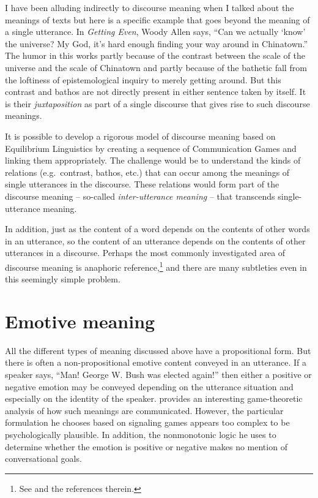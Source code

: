 I have been alluding indirectly to discourse meaning when I talked about the meanings of texts but here is a specific example that goes beyond the meaning of a single utterance. In \emph{Getting Even}, Woody Allen says, ``Can we actually `know' the universe? My God, it's hard enough finding your way around in Chinatown.'' The humor in this works partly because of the contrast between the scale of the universe and the scale of Chinatown and partly because of the bathetic fall from the loftiness of epistemological inquiry to merely getting around. But this contrast and bathos are not directly present in either sentence taken by itself. It is their \emph{juxtaposition} as part of a single discourse that gives rise to such discourse meanings. 

It is possible to develop a rigorous model of discourse meaning based on Equilibrium Linguistics by creating a sequence of Communication Games and linking them appropriately. The challenge would be to understand the kinds of relations (e.g.\ contrast, bathos, etc.) that can occur among the meanings of single utterances in the discourse. These relations would form part of the discourse meaning -- so-called \emph{inter-utterance meaning} -- that transcends single-utterance meaning. 

In addition, just as the content of a word depends on the contents of other words in an utterance, so the content of an utterance depends on the contents of other utterances in a discourse. Perhaps the most commonly investigated area of discourse meaning is anaphoric reference,\footnote{See \citet{cp:ga} and the references therein.} and there are many subtleties even in this seemingly simple problem.



\section{Emotive meaning}

All the different types of meaning discussed above have a propositional form. But there is often a non-propositional emotive content conveyed in an utterance. If a speaker says, ``Man! George W. Bush was elected again!'' then either a positive or negative emotion may be conveyed depending on the utterance situation and especially on the identity of the speaker. \citet{mccready:ee} provides an interesting game-theoretic analysis of how such meanings are communicated. However, the particular formulation he chooses based on signaling games appears too complex to be psychologically plausible. In addition, the nonmonotonic logic he uses to determine whether the emotion is positive or negative makes no mention of conversational goals. 

